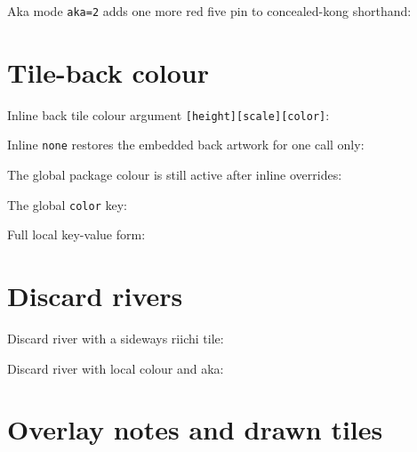 \documentclass{article}
\begin{document}
Aka mode \texttt{aka=2} adds one more red five pin to concealed-kong shorthand:


\section*{Tile-back colour}

Inline back tile colour argument \texttt{[height][scale][color]}:



Inline \texttt{none} restores the embedded back artwork for one call only:


The global package colour is still active after inline overrides:


The global \texttt{color} key:



Full local key-value form:


\section*{Discard rivers}


Discard river with a sideways riichi tile:


Discard river with local colour and aka:


\section*{Overlay notes and drawn tiles}


\end{document}
